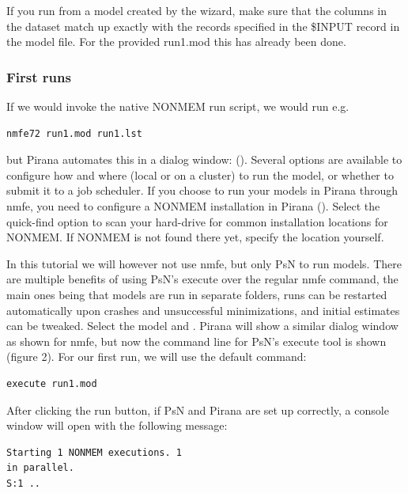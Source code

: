 If you run from a model created by the wizard, make sure that the columns in the dataset match up exactly
with the records specified in the \$INPUT record in the model file. For
the provided run1.mod this has already been done. 

\subsubsection{First runs}If we would invoke the native NONMEM run script, we would run e.g. 

\begin{lstlisting}
nmfe72 run1.mod run1.lst
\end{lstlisting}

\noindent but Pirana automates this in a dialog window:
(). 
Several options are available to configure how and where (local or on a cluster) to run
the model, or whether to submit it to a job scheduler. If you choose
to run your models in Pirana through nmfe, you need to configure a
NONMEM installation in Pirana (). Select the
quick-find option to scan your hard-drive for common installation
locations for NONMEM. If NONMEM is not found there yet, specify the
location yourself. 


In this tutorial we will however not use nmfe, but only PsN to run
models. There are multiple benefits of using PsN’s execute over the
regular nmfe command, the main ones being that models are run in
separate folders, runs can be restarted automatically upon crashes and
unsuccessful minimizations, and initial estimates can be
tweaked. Select the model and . Pirana will show a similar dialog window as
shown for nmfe, but now the command line for PsN’s execute tool is
shown (figure 2). For our first run, we will use the default command:

\begin{lstlisting}
execute run1.mod
\end{lstlisting}

\noindent After clicking the run button, if PsN and Pirana are
set up correctly, a console window will open with the following
message:

\begin{lstlisting}
Starting 1 NONMEM executions. 1
in parallel.
S:1 .. 
\end{lstlisting}

